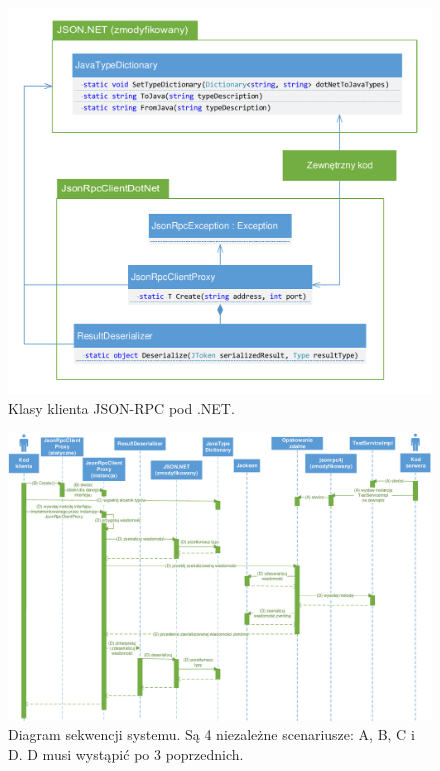 \begin{figure}
	\centering
		\includegraphics[width=\textwidth]{img/schematy/schemat-klas-net.pdf}
	\caption{Klasy klienta JSON-RPC pod .NET.}
	\label{fig:dot-net-classes}
\end{figure}

\begin{figure}
	\centering
		\includegraphics[angle=90,origin=c,scale=0.8]{img/schematy/diagram-sekwencji.pdf}
	\caption[Diagram sekwencji systemu.]{Diagram sekwencji systemu. Są 4 niezależne scenariusze: A, B, C i D. D musi wystąpić po 3 poprzednich.}
	\label{fig:sequence-diagram}
\end{figure}

